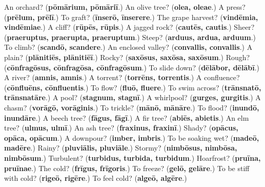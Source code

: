 \begin{tcolorbox}[breakable,colback=teal!4,colframe=teal!35!black,title={Before you move on}]
An orchard? (\textbf{pōmārium, pōmāriī}.) An olive tree? (\textbf{olea, oleae}.) A press? (\textbf{prēlum, prēlī}.) To graft? (\textbf{īnserō, īnserere}.) The grape harvest? (\textbf{vindēmia, vindēmiae}.) A cliff? (\textbf{rūpēs, rūpis}.) A jagged rock? (\textbf{cautēs, cautis}.) Sheer? (\textbf{praeruptus, praerupta, praeruptum}.) Steep? (\textbf{arduus, ardua, arduum}.) To climb? (\textbf{scandō, scandere}.) An enclosed valley? (\textbf{convallis, convallis}.) A plain? (\textbf{plānitiēs, plānitiēī}.) Rocky? (\textbf{saxōsus, saxōsa, saxōsum}.) Rough? (\textbf{cōnfragōsus, cōnfragōsa, cōnfragōsum}.) To slide down? (\textbf{dēlābor, dēlābī}.) A river? (\textbf{amnis, amnis}.) A torrent? (\textbf{torrēns, torrentis}.) A confluence? (\textbf{cōnfluēns, cōnfluentis}.) To flow? (\textbf{fluō, fluere}.) To swim across? (\textbf{trānsnatō, trānsnatāre}.) A pool? (\textbf{stagnum, stagnī}.) A whirlpool? (\textbf{gurges, gurgitis}.) A chasm? (\textbf{vorāgō, vorāginis}.) To trickle? (\textbf{mānō, mānāre}.) To flood? (\textbf{inundō, inundāre}.) A beech tree? (\textbf{fāgus, fāgī}.) A fir tree? (\textbf{abiēs, abietis}.) An elm tree? (\textbf{ulmus, ulmī}.) An ash tree? (\textbf{fraxinus, fraxinī}.) Shady? (\textbf{opācus, opāca, opācum}.) A downpour? (\textbf{imber, imbris}.) To be soaking wet? (\textbf{madeō, madēre}.) Rainy? (\textbf{pluviālis, pluviāle}.) Stormy? (\textbf{nimbōsus, nimbōsa, nimbōsum}.) Turbulent? (\textbf{turbidus, turbida, turbidum}.) Hoarfrost? (\textbf{pruīna, pruīnae}.) The cold? (\textbf{frīgus, frīgoris}.) To freeze? (\textbf{gelō, gelāre}.) To be stiff with cold? (\textbf{rigeō, rigēre}.) To feel cold? (\textbf{algeō, algēre}.)
\end{tcolorbox}
